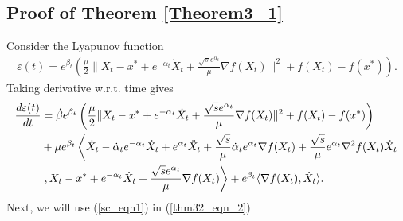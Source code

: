 \documentclass{article}
\theoremstyle{plain}
\theoremstyle{definition}
\theoremstyle{remark}
\begin{document}
\subsection{Proof of Theorem \ref{Theorem3_1}}\label{thm4_proof}
Consider the Lyapunov function
    \begin{align}\label{thm32_eqn_1}
        \varepsilon(t) = e^{\beta_t}\left(\frac{\mu}{2}\|X_t-x^*+e^{-\alpha_t}\dot X_t+\frac{\sqrt{s}e^{\alpha_t}}{\mu}\nabla f(X_t)\|^2+f(X_t)-f(x^*)\right).
    \end{align}
    Taking derivative w.r.t. time gives
    \begin{align}\label{thm32_eqn_2}
       \frac{d\varepsilon(t)}{dt}&=\dot \beta e^{\beta_t}\left(\frac{\mu}{2}\|X_t-x^*+e^{-\alpha_t}\dot X_t+\frac{\sqrt{s}e^{\alpha_t}}{\mu}\nabla f(X_t)\|^2+f(X_t)-f(x^*)\right)\nonumber\\
       & + \mu e^{\beta_t}\left\langle \dot X_t-\dot \alpha_t e^{-\alpha_t}\dot X_t + e^{\alpha_t}\Ddot{X}_t +\frac{\sqrt{s}}{\mu}\dot \alpha_te^{\alpha_t}\nabla f(X_t)+\frac{\sqrt{s}}{\mu}e^{\alpha_t}\nabla ^2f(X_t)\dot X_t\right.\nonumber\\
       &\left. ,X_t-x^*+e^{-\alpha_t}\dot X_t+\frac{\sqrt{s}e^{\alpha_t}}{\mu}\nabla f(X_t)\right\rangle+e^{\beta_t}\langle \nabla f(X_t),\dot X_t \rangle.
    \end{align}
    Next, we will use (\ref{sc_eqn1}) in (\ref{thm32_eqn_2})
\end{document}
